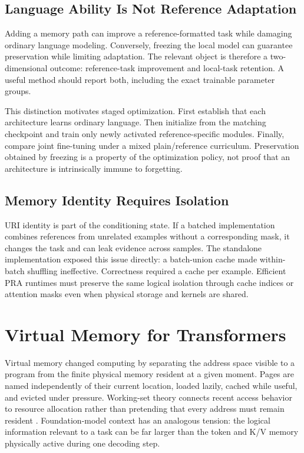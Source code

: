 \documentclass[11pt]{article}
\begin{document}
\subsection{Language Ability Is Not Reference Adaptation}

Adding a memory path can improve a reference-formatted task while damaging ordinary language modeling. Conversely, freezing the local model can guarantee preservation while limiting adaptation. The relevant object is therefore a two-dimensional outcome: reference-task improvement and local-task retention. A useful method should report both, including the exact trainable parameter groups.

This distinction motivates staged optimization. First establish that each architecture learns ordinary language. Then initialize from the matching checkpoint and train only newly activated reference-specific modules. Finally, compare joint fine-tuning under a mixed plain/reference curriculum. Preservation obtained by freezing is a property of the optimization policy, not proof that an architecture is intrinsically immune to forgetting.

\subsection{Memory Identity Requires Isolation}

URI identity is part of the conditioning state. If a batched implementation combines references from unrelated examples without a corresponding mask, it changes the task and can leak evidence across samples. The standalone implementation exposed this issue directly: a batch-union cache made within-batch shuffling ineffective. Correctness required a cache per example. Efficient PRA runtimes must preserve the same logical isolation through cache indices or attention masks even when physical storage and kernels are shared.

\section{Virtual Memory for Transformers}

Virtual memory changed computing by separating the address space visible to a program from the finite physical memory resident at a given moment. Pages are named independently of their current location, loaded lazily, cached while useful, and evicted under pressure. Working-set theory connects recent access behavior to resource allocation rather than pretending that every address must remain resident \cite{denning1968workingset}. Foundation-model context has an analogous tension: the logical information relevant to a task can be far larger than the token and K/V memory physically active during one decoding step.
\end{document}
